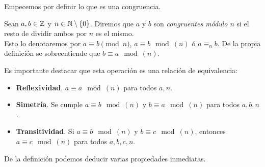 Empecemos por definir lo que es una congruencia.

\begin{definicion}
	Sean $a, b \in \mathbb{Z}$ y $n \in \mathbb{N} \setminus \{0\}$. Diremos que $a$ y $b$ son \textit{congruentes módulo $n$} si el resto de dividir ambos por $n$ es el mismo.\\
	
	Esto lo denotaremos por $a \equiv b \pmod{n}$, $a \equiv b \mod(n)$ ó $a \equiv_n b$. De la propia definición se sobreentiende que $b \equiv a \mod(n)$.
\end{definicion}

Es importante destacar que esta operación es una relación de equivalencia:

\begin{itemize}
	\item \textbf{Reflexividad}. $a \equiv a \mod(n)$ para todos $a, n$.
	
	\item \textbf{Simetría}. Se cumple $a \equiv b \mod(n)$ y $b \equiv a \mod(n)$ para todos $a, b, n$.
	
	\item \textbf{Transitividad}. Si $a \equiv b \mod(n)$ y $b \equiv c \mod(n)$, entonces $a \equiv c \mod(n)$ para todos $a, b, c, n$.
\end{itemize}

De la definición podemos deducir varias propiedades inmediatas.

